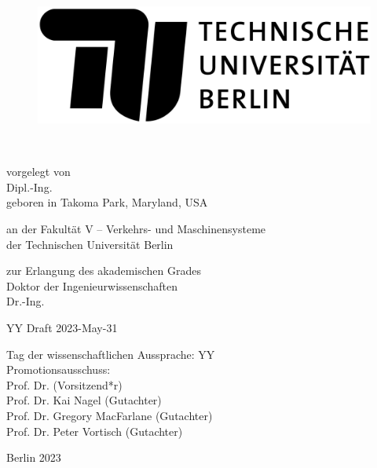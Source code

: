 
\thispagestyle{empty}

\begin{flushright}

	\begin{figure}[!h]
  	\begin{minipage}{1.62\linewidth}
	\begin{center}
	\includegraphics[scale=0.085]{chapters/title/tu-logo-2023.png}
  	\end{center}
  	\end{minipage}
	\end{figure}

	\vspace{20mm}

	\LARGE

	\textbf{\hspace{60mm}\Title} \\[2cm]

	\hrulefill

	\large
	vorgelegt von\\

	Dipl.-Ing. \Autor\\
	geboren in Takoma Park, Maryland, USA\\
	\vspace{10mm}

	an der Fakultät V -- Verkehrs- und Maschinensysteme\\
	der Technischen Universität Berlin

	zur Erlangung des akademischen Grades\\
	Doktor der Ingenieurwissenschaften\\
	Dr.-Ing.\\
	\vspace{5mm}

	YY Draft 2023-May-31\\

	\hrulefill

 	Tag der wissenschaftlichen Aussprache: YY  \\

	\vspace{5mm}
	Promotionsausschuss:\\
	Prof. Dr. (Vorsitzend*r)\\
	Prof. Dr. Kai Nagel (Gutachter)\\
	Prof. Dr. Gregory MacFarlane (Gutachter)\\
	Prof. Dr. Peter Vortisch (Gutachter)\\
	\vspace{6mm}

	Berlin 2023\\

\end{flushright}